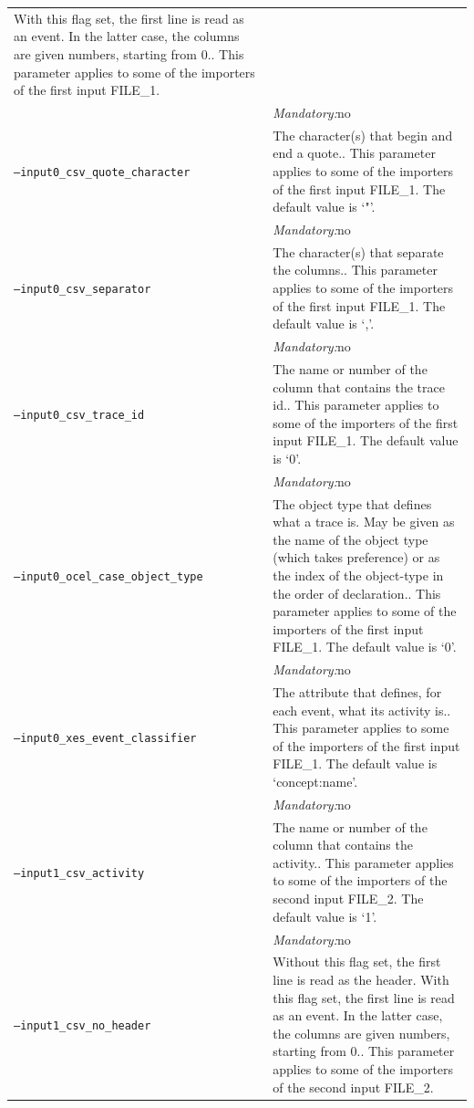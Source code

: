 {\begin{tabularx}{\linewidth}{lX}
    With this flag set, the first line is read as an event. In the latter case, the columns are given numbers, starting from 0.. This parameter applies to some of the importers of the first input FILE\_1. \\
&\textit{Mandatory:}\quad no\\
\texttt{--input0\_csv\_quote\_character} & The character(s) that begin and end a quote.. This parameter applies to some of the importers of the first input FILE\_1. The default value is `"'.\\
&\textit{Mandatory:}\quad no\\
\texttt{--input0\_csv\_separator} & The character(s) that separate the columns.. This parameter applies to some of the importers of the first input FILE\_1. The default value is `,'.\\
&\textit{Mandatory:}\quad no\\
\texttt{--input0\_csv\_trace\_id} & The name or number of the column that contains the trace id.. This parameter applies to some of the importers of the first input FILE\_1. The default value is `0'.\\
&\textit{Mandatory:}\quad no\\
\texttt{--input0\_ocel\_case\_object\_type} & The object type that defines what a trace is. May be given as the name of the object type (which takes preference) or as the index of the object-type in the order of declaration.. This parameter applies to some of the importers of the first input FILE\_1. The default value is `0'.\\
&\textit{Mandatory:}\quad no\\
\texttt{--input0\_xes\_event\_classifier} & The attribute that defines, for each event, what its activity is.. This parameter applies to some of the importers of the first input FILE\_1. The default value is `concept:name'.\\
&\textit{Mandatory:}\quad no\\
\texttt{--input1\_csv\_activity} & The name or number of the column that contains the activity.. This parameter applies to some of the importers of the second input FILE\_2. The default value is `1'.\\
&\textit{Mandatory:}\quad no\\
\texttt{--input1\_csv\_no\_header} & Without this flag set, the first line is read as the header. 
    With this flag set, the first line is read as an event. In the latter case, the columns are given numbers, starting from 0.. This parameter applies to some of the importers of the second input FILE\_2. \\

\end{tabularx}}
